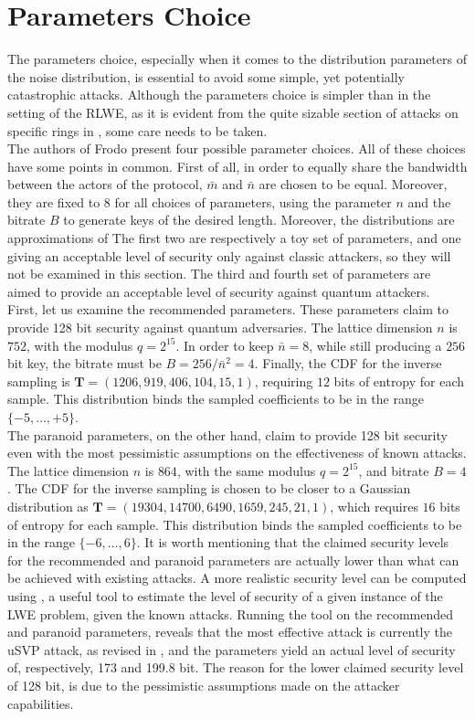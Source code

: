 \section{Parameters Choice}
The parameters choice, especially when it comes to the distribution parameters of the noise distribution, is essential to avoid some simple, yet potentially catastrophic attacks. Although the parameters choice is simpler than in the setting of the RLWE, as it is evident from the quite sizable section of attacks on specific rings in \cite{RLWE_attacks}, some care needs to be taken.\\
The authors of Frodo present four possible parameter choices. All of these choices have some points in common. First of all, in order to equally share the bandwidth between the actors of the protocol, $\bar{m}$ and $\bar{n}$ are chosen to be equal. Moreover, they are fixed to $8$ for all choices of parameters, using the parameter $n$ and the bitrate $B$ to generate keys of the desired length. Moreover, the distributions are approximations of 
The first two are respectively a toy set of parameters, and one giving an acceptable level of security only against classic attackers, so they will not be examined in this section. The third and fourth set of parameters are aimed to provide an acceptable level of security against quantum attackers.\\
First, let us examine the recommended parameters. These parameters claim to provide 128 bit  security against quantum adversaries. The lattice dimension $n$ is $752$, with the modulus $q=2^{15}$. In order to keep $\bar{n}=8$, while still producing a $256$ bit key, the bitrate must be $B=256/\bar{n}^2=4$. Finally, the CDF for the inverse sampling is $\mathbf{T}=(1206, 919, 406, 104, 15, 1)$, requiring $12$ bits of entropy for each sample. This distribution binds the sampled coefficients to be in the range $\{-5,\ldots,+5\}$.\\
The paranoid parameters, on the other hand, claim to provide 128 bit security even with the most pessimistic assumptions on the effectiveness of known attacks. The lattice dimension $n$ is $864$, with the same modulus $q=2^{15}$, and bitrate $B=4$. The CDF for the inverse sampling is chosen to be closer to a Gaussian distribution as $\mathbf{T}=(19304, 14700, 6490, 1659, 245, 21, 1)$, which requires $16$ bits of entropy for each sample. This distribution binds the sampled coefficients to be in the range $\{-6,\ldots,6\}$.
It is worth mentioning that the claimed security levels for the recommended and paranoid parameters are actually lower than what can be achieved with existing attacks. A more realistic security level can be computed using \cite{parameters}, a useful tool to estimate the level of security of a given instance of the LWE problem, given the known attacks. Running the tool on the recommended and paranoid parameters, reveals that the most effective attack is currently the uSVP attack, as revised in \cite{RUSVP}, and the parameters yield an actual level of security of, respectively, 173 and 199.8 bit. The reason for the lower claimed security level of 128 bit, is due to the pessimistic assumptions made on the attacker capabilities.

